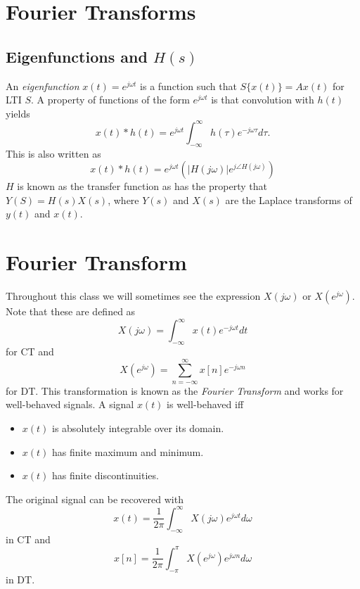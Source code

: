 \section{Fourier Transforms} \label{sec:fouriertransforms}

\subsection{Eigenfunctions and $H(s)$}

An \emph{eigenfunction} $x(t) = e^{j\omega t}$ is a function such that
$S\{x(t)\} = Ax(t)$ for LTI $S$. A property of functions of the form
$e^{j\omega t}$ is that convolution with $h(t)$ yields
\begin{equation}
    x(t) * h(t) = e^{j\omega t} \int_{-\infty}^{\infty} h(\tau) e^{-j\omega \tau} d\tau.
\end{equation}
This is also written as
\begin{equation}
    x(t) * h(t) = e^{j\omega t} \left( |H(j\omega)|e^{j \angle H(j\omega)} \right)
\end{equation}
$H$ is known as the transfer function as has the property that
$Y(S) = H(s)X(s)$, where $Y(s)$ and $X(s)$ are the Laplace transforms
of $y(t)$ and $x(t)$.

\section{Fourier Transform}
Throughout this class we will sometimes see the expression $X(j\omega)$
or $X(e^{j\omega})$.
Note that these are defined as
\begin{equation}
    X(j\omega) = \int_{-\infty}^{\infty} x(t) e^{-j\omega t} dt
\end{equation}
for CT and
\begin{equation}
    X(e^{j\omega}) = \sum_{n=-\infty}^{\infty} x[n] e^{-j\omega n}
\end{equation}
for DT. This transformation is known as the \emph{Fourier Transform}
and works for well-behaved signals.
A signal $x(t)$ is well-behaved iff
\begin{itemize}
    \item $x(t)$ is absolutely integrable over its domain.
    \item $x(t)$ has finite maximum and minimum.
    \item $x(t)$ has finite discontinuities.
\end{itemize}
The original signal can be recovered with
\begin{equation}
    x(t) = \frac{1}{2\pi} \int_{-\infty}^{\infty} X(j\omega) e^{j\omega t} d\omega
\end{equation}
in CT and
\begin{equation}
    x[n] = \frac{1}{2\pi} \int_{-\pi}^{\pi} X(e^{j\omega}) e^{j\omega n} d\omega
\end{equation}
in DT.


